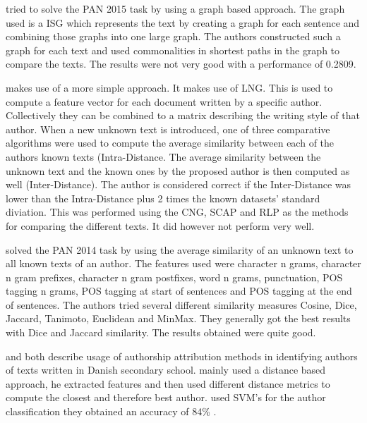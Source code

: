 \cite{gomezadorno2015} tried to solve the PAN 2015 task by using a graph based
approach. The graph used is a \gls{ISG} which represents the text by creating a
graph for each sentence and combining those graphs into one large graph. The
authors constructed such a graph for each text and used commonalities in
shortest paths in the graph to compare the texts. The results were not very
good with a performance of 0.2809.

\cite{layton:2014} makes use of a more simple approach. It makes use of \gls{LNG}. This is used to compute a feature vector for each document
written by a specific author. Collectively they can be combined to a matrix
describing the writing style of that author. When a new unknown text is
introduced, one of three comparative algorithms were used to compute the average
similarity between each of the authors known texts (Intra-Distance. The average
similarity between the unknown text and the known ones by the proposed author is
then computed as well (Inter-Distance). The author is considered correct if
the Inter-Distance was lower than the Intra-Distance plus 2 times the known
datasets' standard diviation. This was performed using the \gls{CNG}, \gls{SCAP} and \gls{RLP} as
the methods for comparing the different texts. It did however not perform very
well.

\cite{castro2015} solved the PAN 2014 task by using the average similarity of an
unknown text to all known texts of an author. The features used were character n
grams, character n gram prefixes, character n gram postfixes, word n grams,
punctuation, \gls{POS} tagging n grams, \gls{POS} tagging at start of sentences
and \gls{POS} tagging at the end of sentences. The authors tried several
different similarity measures Cosine, Dice, Jaccard, Tanimoto, Euclidean and
MinMax. They generally got the best results with Dice and Jaccard similarity.
The results obtained were quite good.

\cite{hansen2014} and \cite{aalykke2016} both describe usage of authorship
attribution methods in identifying authors of texts written in Danish secondary
school. \cite{aalykke2016} mainly used a distance based approach, he extracted
features and then used different distance metrics to compute the closest and
therefore best author. \cite{hansen2014} used SVM's for the author
classification they obtained an accuracy of 84\% .
